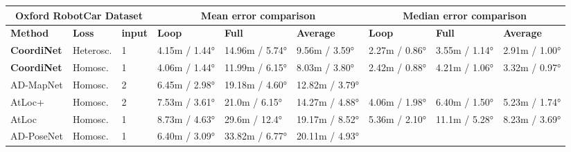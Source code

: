\documentclass[10pt,twocolumn,letterpaper]{article}
\begin{document}
\begin{table*}[!t]
\begin{tabular}{|l|l|l|l|l|l|l|l|l|}
\hline
\multicolumn{3}{|c|}{\textbf{Oxford RobotCar Dataset}} & \multicolumn{3}{c|}{\textbf{Mean error comparison}}                                                                    & \multicolumn{3}{c|}{\textbf{Median error comparison}}                                                 \\ \hline
\textbf{Method}      & \textbf{Loss}  & \textbf{input}  & \textbf{Loop}                         & \textbf{Full}                         & \textbf{Average}                       & \textbf{Loop}                 & \textbf{Full}                 & \textbf{Average}                      \\ \hline
\textbf{CoordiNet}   & Heterosc.          & 1               & 4.15m / 1.44° & 14.96m / 5.74° & 9.56m / 3.59° & \cellcolor[HTML]{92D050}2.27m / 0.86° & \cellcolor[HTML]{92D050}3.55m / 1.14° & \cellcolor[HTML]{92D050}2.91m / 1.00°         \\ \hline
\textbf{CoordiNet}   & Homosc.            & 1               & \cellcolor[HTML]{92D050}4.06m / 1.44° & \cellcolor[HTML]{92D050}11.99m / 6.15°  & \cellcolor[HTML]{92D050}8.03m / 3.80° & 2.42m / 0.88° & 4.21m / 1.06°                         & 3.32m / 0.97°                                \\ \hline
AD-MapNet            & Homosc.            & 2               & 6.45m / 2.98°                         & 19.18m / 4.60°                        & 12.82m / 3.79°                         &                               &                               &                                       \\ \hline
AtLoc+               & Homosc.            & 2               & 7.53m / 3.61°                         & 21.0m / 6.15°                         & 14.27m / 4.88°                         & 4.06m / 1.98°                 & 6.40m / 1.50°                 & 5.23m / 1.74°                         \\ \hline
AtLoc                & Homosc.            & 1               & 8.73m / 4.63°                         & \cellcolor[HTML]{FFC000}29.6m / 12.4° & \cellcolor[HTML]{FFC000}19.17m / 8.52° & \cellcolor[HTML]{FFC000}5.36m / 2.10°                 & \cellcolor[HTML]{FFC000}11.1m / 5.28°                 & \cellcolor[HTML]{FFC000}8.23m / 3.69° \\ \hline
AD-PoseNet         & Homosc.            & 1               & \cellcolor[HTML]{FFC000}6.40m / 3.09° & 33.82m / 6.77°                        & 20.11m / 4.93°                         &                               &                               &                                       \\ \hline

\end{tabular}
\end{table*}
\end{document}
